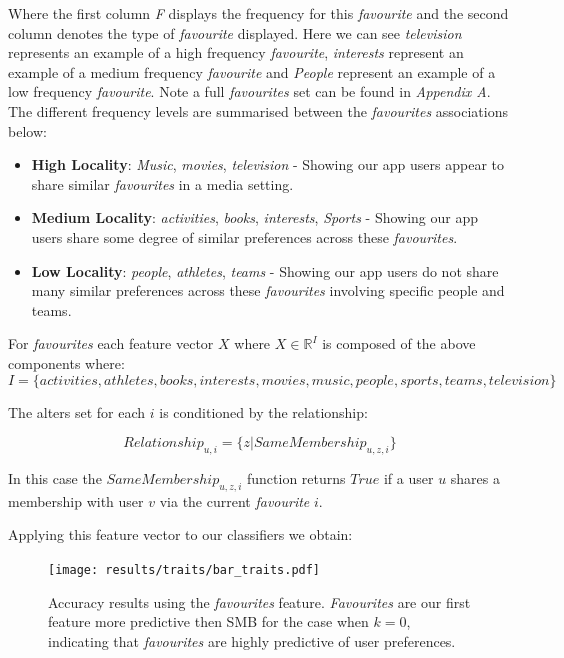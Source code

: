 Where the first column \emph{F} displays the frequency for this \emph{favourite} and the second column denotes the type of \emph{favourite} displayed. 
Here we can see \emph{television} represents an example of a high frequency \emph{favourite}, \emph{interests} represent an example of a 
medium frequency \emph{favourite} and \emph{People} represent an example of a low frequency \emph{favourite}.
Note a full \emph{favourites} set can be found in \emph{Appendix A}.
\\ 

The different frequency levels are summarised between the \emph{favourites} associations below:
\begin{itemize}
\item \textbf{High Locality}: \emph{Music}, \emph{movies}, \emph{television} - Showing our app users appear to share similar \emph{favourites} in a media 
setting.
\item \textbf{Medium Locality}: \emph{activities}, \emph{books}, \emph{interests}, \emph{Sports} - Showing our app users share some degree of similar preferences 
across these \emph{favourites}.
\item \textbf{Low Locality}: \emph{people}, \emph{athletes}, \emph{teams} - Showing our app users do not share many similar preferences  
across these \emph{favourites} involving specific people and teams.
\end{itemize}

For \emph{favourites} each feature vector $X$ where $X \in \mathbb{R}^I$ is composed of the above components where:
\[ I = \{activities, athletes, books, interests, movies, music, people, sports, teams, television\} \]

The alters set for each $i$ is conditioned by the relationship:

\[ Relationship_{u,i} = \{z | SameMembership_{u,z,i}\} \]

In this case the $SameMembership_{u,z,i}$ function returns $True$ if a user $u$ shares a membership with user $v$ via the current \emph{favourite} $i$.

Applying this feature vector to our classifiers we obtain:

\begin{figure}[h]
	\begin{center}
		\texttt{[image: results/traits/bar\_traits.pdf]}
		\caption{Accuracy results using the \emph{favourites} feature. \emph{Favourites} are our first feature more predictive then SMB
				 for the case when $k=0$, indicating that \emph{favourites} are highly predictive of user preferences.}
	\end{center}
\end{figure}

